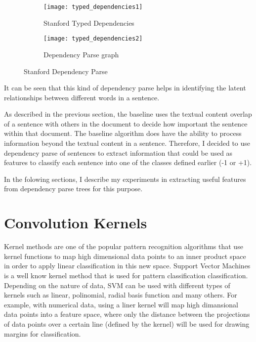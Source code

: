 \begin{figure}[h]
\begin{subfigure}{0.5\textwidth}
\texttt{[image: typed\_dependencies1]} 
\caption{Stanford Typed Dependencies}
\label{fig:typed-dep}
\end{subfigure}
\begin{subfigure}{0.5\textwidth}
\texttt{[image: typed\_dependencies2]}
\caption{Dependency Parse graph}
\label{fig:dep-parse}
\end{subfigure}
 
\caption{Stanford Dependency Parse}
\label{fig:stanford-dep-parse}
\end{figure}

It can be seen that this kind of dependency parse helps in identifying the latent relationships between different words in a sentence.

As described in the previous section, the baseline uses the textual content overlap of a sentence with others in the document to decide how important the sentence within that document.
The baseline algorithm does have the ability to process information beyond the textual content in a sentence.
Therefore, I decided to use dependency parse of sentences to extract information that could be used as features to classify each sentence into one of the classes defined earlier (-1 or +1).

In the folowing sections, I describe my experiments in extracting useful features from dependency parse trees for this purpose.

\section{Convolution Kernels}
Kernel methods are one of the popular pattern recognition algorithms that use kernel functions to map high dimensional data points to an inner product space in order to apply linear classification in this new space.
Support Vector Machines is a well know kernel method that is used for pattern classification classification.
Depending on the nature of data, SVM can be used with different types of kernels such as linear, polinomial, radial basis function and many others.
For example, with numerical data, using a liner kernel will map high dimansional data points into a feature space, where only the distance between the projections of data points over a certain line (defined by the kernel) will be used for drawing margins for classification.

